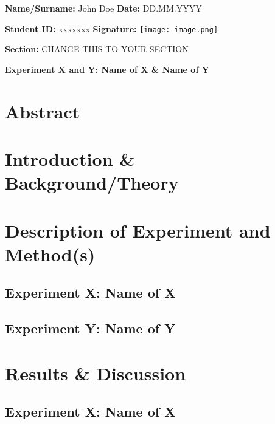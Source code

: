 \documentclass[11pt]{article}
\begin{document}
\textbf{Name/Surname:} John Doe \hfill \textbf{Date:} DD.MM.YYYY %

\textbf{Student ID:} xxxxxxx \hfill \textbf{Signature:}
    \texttt{[image: image.png]} %


\textbf{Section:} CHANGE THIS TO YOUR SECTION

\begin{center}
  \textbf{Experiment X and Y: Name of X \& Name of Y}
\end{center}

\section{Abstract}


\section{Introduction \& Background/Theory}



\section{Description of Experiment and Method(s)}
\subsection{Experiment X: Name of X}



\subsection{Experiment Y: Name of Y    }


\section{Results \& Discussion}
\subsection{Experiment X: Name of X}
\end{document}
